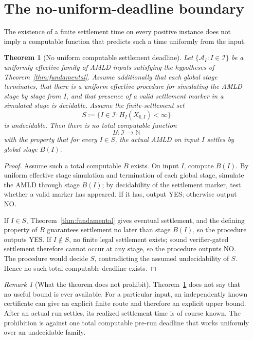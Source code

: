 \documentclass[11pt]{article}
\newtheorem{theorem}[definition]{Theorem}
\theoremstyle{remark}
\newtheorem{remark}[definition]{Remark}
\newcommand{\N}{\mathbb N}
\begin{document}
\section{The no-uniform-deadline boundary}

The existence of a finite settlement time on every positive instance does not imply a computable function that predicts such a time uniformly from the input.

\begin{theorem}[No uniform computable settlement deadline]\label{thm:deadline}
Let $\{\mathcal A_I:I\in\mathcal I\}$ be a uniformly effective family of AMLD inputs satisfying the hypotheses of Theorem~\ref{thm:fundamental}.  Assume additionally that each global stage terminates, that there is a uniform effective procedure for simulating the AMLD stage by stage from $I$, and that presence of a valid settlement marker in a simulated stage is decidable.  Assume the finite-settlement set
\[
S:=\{I\in\mathcal I:H_I(X_{0,I})<\infty\}
\]
is undecidable.  Then there is no total computable function
\[
B:\mathcal I\to\N
\]
with the property that for every $I\in S$, the actual AMLD on input $I$ settles by global stage $B(I)$.
\end{theorem}

\begin{proof}
Assume such a total computable $B$ exists.  On input $I$, compute $B(I)$.  By uniform effective stage simulation and termination of each global stage, simulate the AMLD through stage $B(I)$; by decidability of the settlement marker, test whether a valid marker has appeared.  If it has, output YES; otherwise output NO.

If $I\in S$, Theorem~\ref{thm:fundamental} gives eventual settlement, and the defining property of $B$ guarantees settlement no later than stage $B(I)$, so the procedure outputs YES.  If $I\notin S$, no finite legal settlement exists; sound verifier-gated settlement therefore cannot occur at any stage, so the procedure outputs NO.  The procedure would decide $S$, contradicting the assumed undecidability of $S$.  Hence no such total computable deadline exists.
\end{proof}

\begin{remark}[What the theorem does not prohibit]
Theorem~\ref{thm:deadline} does not say that no useful bound is ever available.  For a particular input, an independently known certificate can give an explicit finite route and therefore an explicit upper bound.  After an actual run settles, its realized settlement time is of course known.  The prohibition is against one total computable pre-run deadline that works uniformly over an undecidable family.
\end{remark}
\end{document}
